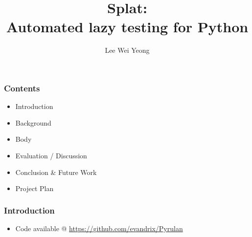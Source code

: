 \documentclass[t]{beamer}
\author{Lee Wei Yeong}
\title[lwy08@ic.ac.uk]{Splat:\\Automated lazy testing for Python}
\begin{document}
\frame{\maketitle}
\begin{frame}
\frametitle{Contents}
	\begin{itemize}
	\item Introduction
	\item Background
	\item Body
	\item Evaluation / Discussion
	\item Conclusion \& Future Work
	\item Project Plan
	\end{itemize}
\end{frame}
\begin{frame}
\frametitle{Introduction}
	\begin{itemize}
	\item Code available @ \url{https://github.com/evandrix/Pyrulan}
	\end{itemize}
\end{frame}
\end{document}
